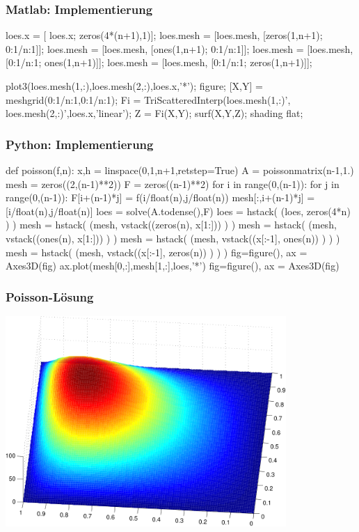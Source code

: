 \documentclass[hyperref={xetex}]{beamer}
\begin{document}
%
% 
\begin{frame}[fragile]\frametitle{Matlab: Implementierung}
\begin{matlabin}

loes.x = [ loes.x; zeros(4*(n+1),1)];
loes.mesh = [loes.mesh, [zeros(1,n+1); 0:1/n:1]];
loes.mesh = [loes.mesh, [ones(1,n+1);  0:1/n:1]];
loes.mesh = [loes.mesh, [0:1/n:1; ones(1,n+1)]];
loes.mesh = [loes.mesh, [0:1/n:1; zeros(1,n+1)]];

plot3(loes.mesh(1,:),loes.mesh(2,:),loes.x,'*');
figure;
[X,Y] = meshgrid(0:1/n:1,0:1/n:1);
Fi = TriScatteredInterp(loes.mesh(1,:)', loes.mesh(2,:)',loes.x,'linear');
Z = Fi(X,Y);
surf(X,Y,Z); shading flat;
\end{matlabin}
\end{frame}

\begin{frame}[fragile]\frametitle{Python: Implementierung}
  \begin{pyin}
def poisson(f,n):
    x,h = linspace(0,1,n+1,retstep=True)
    A = poissonmatrix(n-1,1.) 
    mesh = zeros((2,(n-1)**2))
    F = zeros((n-1)**2)
    for i in range(0,(n-1)):
        for j in range(0,(n-1)):
            F[i+(n-1)*j] = f(i/float(n),j/float(n))
            mesh[:,i+(n-1)*j] = [i/float(n),j/float(n)]
    loes = solve(A.todense(),F)
    loes = hstack( (loes, zeros(4*n) ) ) 
    mesh = hstack( (mesh, vstack((zeros(n), x[1:])) ) )
    mesh = hstack( (mesh, vstack((ones(n), x[1:])) ) )
    mesh = hstack( (mesh, vstack((x[:-1], ones(n)) ) ) )
    mesh = hstack( (mesh, vstack((x[:-1], zeros(n)) ) ) )
    fig=figure(), ax = Axes3D(fig)    
    ax.plot(mesh[0,:],mesh[1,:],loes,'*')
    fig=figure(), ax = Axes3D(fig) 
  \end{pyin}
\end{frame}

\begin{frame}[fragile]\frametitle{Poisson-Lösung}
\begin{center}
\includegraphics[width=0.8\textwidth]{./figures/poisson} 
\end{center}
\end{frame}
\end{document}
